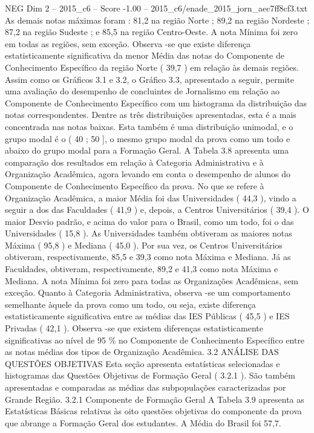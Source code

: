 \begin{textsample}{NEG Dim 2 – 2015\_c6 – Score -1.00 – 2015\_c6/enade\_2015\_jorn\_aec7ff8cf3.txt}
As demais notas máximas foram : 81,2 na região Norte ; 89,2 na região Nordeste ; 87,2 na região Sudeste ; e 85,5 na região Centro-Oeste.
A nota Mínima foi zero em todas as regiões, sem exceção.
Observa -se que existe diferença estatisticamente significativa da menor Média das notas do Componente de Conhecimento Específico da região Norte ( 39,7 ) em relação às demais regiões.
Assim como os Gráficos 3.1 e 3.2, o Gráfico 3.3, apresentado a seguir, permite uma avaliação do desempenho de concluintes de Jornalismo em relação ao Componente de Conhecimento Específico com um histograma da distribuição das notas correspondentes.
Dentre as três distribuições apresentadas, esta é a mais concentrada nas notas baixas.
Esta também é uma distribuição unimodal, e o grupo modal é o ( 40 ; 50 ], o mesmo grupo modal da prova como um todo e abaixo do grupo modal para a Formação Geral.
A Tabela 3.8 apresenta uma comparação dos resultados em relação à Categoria Administrativa e à Organização Acadêmica, agora levando em conta o desempenho de alunos do Componente de Conhecimento Específico da prova.
No que se refere à Organização Acadêmica, a maior Média foi das Universidades ( 44,3 ), vindo a seguir a dos das Faculdades ( 41,9 ) e, depois, a Centros Universitários ( 39,4 ).
O maior Desvio padrão, e acima do valor para o Brasil, como um todo, foi o das Universidades ( 15,8 ).
As Universidades também obtiveram as maiores notas Máxima ( 95,8 ) e Mediana ( 45,0 ).
Por sua vez, os Centros Universitários obtiveram, respectivamente, 85,5 e 39,3 como nota Máxima e Mediana.
Já as Faculdades, obtiveram, respectivamente, 89,2 e 41,3 como nota Máxima e Mediana.
A nota Mínima foi zero para todas as Organizações Acadêmicas, sem exceção.
Quanto à Categoria Administrativa, observa -se um comportamento semelhante àquele da prova como um todo, ou seja, existe diferença estatisticamente significativa entre as médias das IES Públicas ( 45,5 ) e IES Privadas ( 42,1 ).
Observa -se que existem diferenças estatisticamente significativas ao nível de 95 \% no Componente de Conhecimento Específico entre as notas médias dos tipos de Organização Acadêmica. 3.2 ANÁLISE DAS QUESTÕES OBJETIVAS Esta seção apresenta estatísticas selecionadas e histogramas das Questões Objetivas de Formação Geral ( 3.2.1 ).
São também apresentadas e comparadas as médias das subpopulações caracterizadas por Grande Região. 3.2.1 Componente de Formação Geral A Tabela 3.9 apresenta as Estatísticas Básicas relativas às oito questões objetivas do componente da prova que abrange a Formação Geral dos estudantes.
A Média do Brasil foi 57,7.

\end{textsample}
